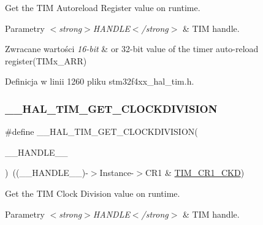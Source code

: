 Get the T\+IM Autoreload Register value on runtime. 


\begin{DoxyParams}{Parametry}
{\em $<$strong$>$\+H\+A\+N\+D\+L\+E$<$/strong$>$} & T\+IM handle. \\
\hline
\end{DoxyParams}

\begin{DoxyRetVals}{Zwracane wartości}
{\em 16-\/bit} & or 32-\/bit value of the timer auto-\/reload register(\+T\+I\+Mx\+\_\+\+A\+R\+R) \\
\hline
\end{DoxyRetVals}


Definicja w linii 1260 pliku stm32f4xx\+\_\+hal\+\_\+tim.\+h.

\mbox{\label{group___t_i_m___exported___macros_gae6bc91bb5940bce52828c690f24001b8}} 
\subsubsection{\texorpdfstring{\+\_\+\+\_\+\+H\+A\+L\+\_\+\+T\+I\+M\+\_\+\+G\+E\+T\+\_\+\+C\+L\+O\+C\+K\+D\+I\+V\+I\+S\+I\+ON}{\_\_HAL\_TIM\_GET\_CLOCKDIVISION}}
{\footnotesize\ttfamily \#define \+\_\+\+\_\+\+H\+A\+L\+\_\+\+T\+I\+M\+\_\+\+G\+E\+T\+\_\+\+C\+L\+O\+C\+K\+D\+I\+V\+I\+S\+I\+ON(\begin{DoxyParamCaption}\item[{}]{\+\_\+\+\_\+\+H\+A\+N\+D\+L\+E\+\_\+\+\_\+ }\end{DoxyParamCaption})~((\+\_\+\+\_\+\+H\+A\+N\+D\+L\+E\+\_\+\+\_\+)-\/$>$Instance-\/$>$C\+R1 \& \hyperlink{group___peripheral___registers___bits___definition_gacacc4ff7e5b75fd2e4e6b672ccd33a72}{T\+I\+M\+\_\+\+C\+R1\+\_\+\+C\+KD})}



Get the T\+IM Clock Division value on runtime. 


\begin{DoxyParams}{Parametry}
{\em $<$strong$>$\+H\+A\+N\+D\+L\+E$<$/strong$>$} & T\+IM handle. \\
\hline
\end{DoxyParams}

